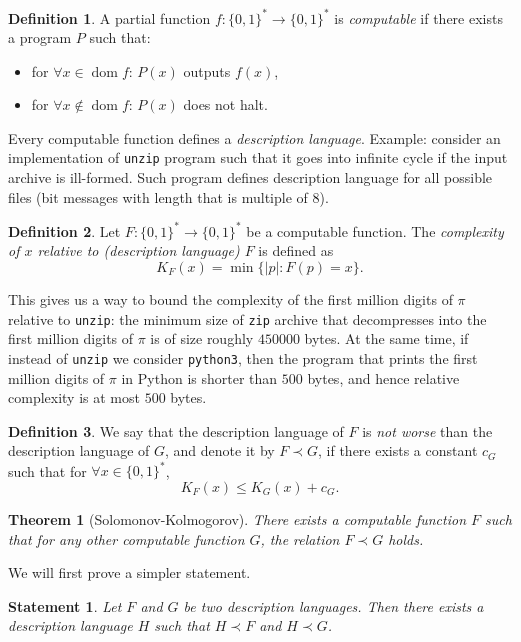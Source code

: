\documentclass[12pt,sans]{article}
\newcommand{\bits}{\{0,1\}}
\newcommand{\bitstr}{\bits^*}
\DeclareMathOperator{\dom}{dom}
\theoremstyle{definition}
\newtheorem{definition}{Definition}[section]
\theoremstyle{plain}
\newtheorem{theorem}{Theorem}[section]
\newtheorem{statement}{Statement}[section]
\theoremstyle{remark}
\begin{document}
\begin{definition}
    A partial function $f:\bitstr\to\bitstr$ is \emph{computable} if there exists a program $P$ such that:
    \begin{itemize}
        \item for $\forall x \in \dom f$: $P(x)$ outputs $f(x)$,
        \item for $\forall x \not\in \dom f$: $P(x)$ does not halt.
    \end{itemize}
\end{definition}
Every computable function defines a \emph{description language}.
Example: consider an implementation of \texttt{unzip} program such that it goes into infinite cycle if the input archive is ill-formed. Such program defines description language for all possible files (bit messages with length that is multiple of $8$).

\begin{definition}
    Let $F:\bitstr\to\bitstr$ be a computable function. The \emph{complexity of $x$ relative to (description language) $F$} is defined as
    \[K_F(x) = \min\{|p| : F(p) = x\}.\]
\end{definition}

This gives us a way to bound the complexity of the first million digits of $\pi$ relative to \texttt{unzip}: the minimum size of \texttt{zip} archive that decompresses into the first million digits of $\pi$ is of size roughly $450000$ bytes. At the same time, if instead of \texttt{unzip} we consider \texttt{python3}, then the program that prints the first million digits of $\pi$ in Python is shorter than $500$ bytes, and hence relative complexity is at most $500$ bytes.

\begin{definition}
    We say that the description language of $F$ is \emph{not worse} than the description language of $G$, and denote it by $F \prec G$, if there exists a constant $c_G$ such that for $\forall x \in \bitstr$,
    \[K_F(x) \le K_G(x) + c_G.\]
\end{definition}

\begin{theorem}[Solomonov-Kolmogorov]\label{thm:solomonov-kolmogorov}
    There exists a computable function $F$ such that for any other computable function $G$, the relation $F \prec G$ holds.
\end{theorem}

We will first prove a simpler statement.
\begin{statement}
    Let $F$ and $G$ be two description languages. Then there exists a description language $H$ such that $H \prec F$ and $H \prec G$.
\end{statement}
\end{document}
